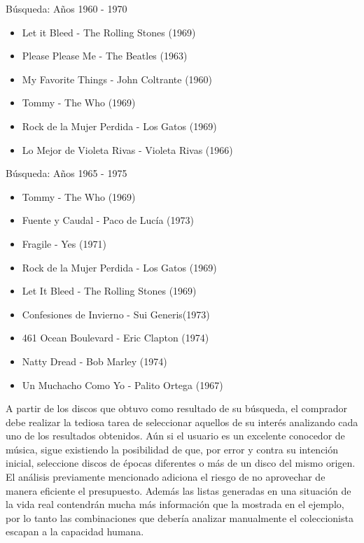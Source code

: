 \begin{mybox}{Búsqueda: Años 1960 - 1970}
\begin{itemize}
	\item {\scriptsize Let it Bleed - The Rolling Stones (1969)}
	\item {\scriptsize Please Please Me - The Beatles (1963)}
	\item {\scriptsize My Favorite Things - John Coltrante (1960)}
	\item {\scriptsize Tommy - The Who (1969)}
	\item {\scriptsize Rock de la Mujer Perdida - Los Gatos (1969)}
	\item {\scriptsize Lo Mejor de Violeta Rivas - Violeta Rivas (1966)}
\end{itemize}
\end{mybox}

\begin{mybox}{Búsqueda: Años 1965 - 1975}
\begin{itemize}
	\item {\scriptsize Tommy - The Who (1969)}
	\item {\scriptsize Fuente y Caudal - Paco de Lucía (1973)}
	\item {\scriptsize Fragile - Yes (1971)}
	\item {\scriptsize Rock de la Mujer Perdida - Los Gatos (1969)}
	\item {\scriptsize Let It Bleed - The Rolling Stones (1969)}
	\item {\scriptsize Confesiones de Invierno - Sui Generis(1973)}
	\item {\scriptsize 461 Ocean Boulevard - Eric Clapton (1974)}
	\item {\scriptsize Natty Dread - Bob Marley (1974)}
	\item {\scriptsize Un Muchacho Como Yo - Palito Ortega (1967)}
\end{itemize}
\end{mybox}

A partir de los discos que obtuvo como resultado de su búsqueda, el comprador debe realizar la tediosa tarea de seleccionar aquellos de su interés analizando cada uno de los resultados obtenidos. Aún si el usuario es un excelente conocedor de música, sigue existiendo la posibilidad de que, por error y contra su intención inicial, seleccione discos de épocas diferentes o más de un disco del mismo origen. El análisis previamente mencionado adiciona el riesgo de no aprovechar de manera eficiente el presupuesto. Además las listas generadas en una situación de la vida real contendrán mucha más información que la mostrada en el ejemplo, por lo tanto las combinaciones que debería analizar manualmente el coleccionista escapan a la capacidad humana. 

